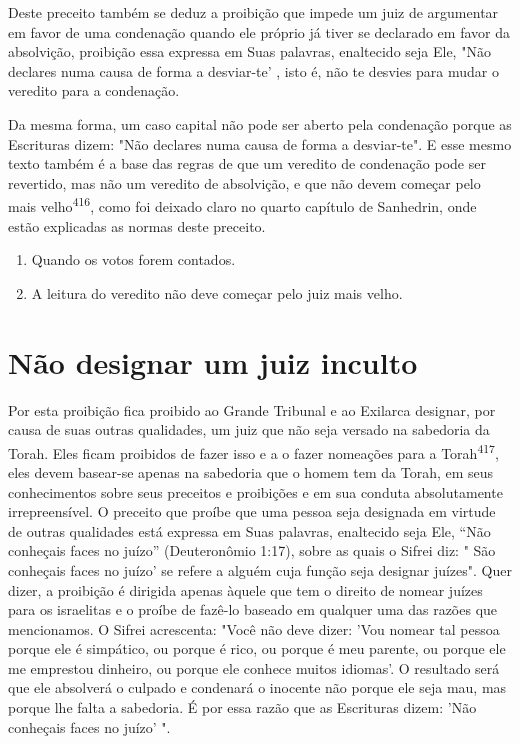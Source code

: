 Deste preceito também se deduz a proibição que impede um juiz de
argumentar em favor de uma condenação quando ele próprio já tiver se
decla­rado em favor da absolvição, proibição essa expressa em Suas
palavras, enalte­cido seja Ele, "Não declares numa causa de forma a
desviar-te' , isto é, não te desvies para mudar o veredito para a
condenação.

Da mesma forma, um caso capital não pode ser aberto pela conde­nação
porque as Escrituras dizem: "Não declares numa causa de forma a
desviar-te". E esse mesmo texto também é a base das regras de que um
veredito de condenação pode ser revertido, mas não um veredito de
absolvição, e que não devem começar pelo mais
velho\textsuperscript{416}, como foi deixado claro no quarto capítu­lo
de Sanhedrin, onde estão explicadas as normas deste preceito.


\begin{enumerate}
\def\labelenumi{\arabic{enumi}.}
\setcounter{enumi}{414}
\item
 
 Quando os votos forem contados.
 
\item
 
 A leitura do veredito não deve começar pelo juiz mais velho.
 
\end{enumerate}


\section{Não designar um juiz inculto}

Por esta proibição fica proibido ao Grande Tribunal e ao Exilarca
designar, por causa de suas outras qualidades, um juiz que não seja
versado na sabedoria da Torah. Eles ficam proibidos de fazer isso e a o
fazer nomeações para a Torah\textsuperscript{417}, eles devem basear-se
apenas na sabedoria que o homem tem da Torah, em seus conhecimentos
sobre seus preceitos e proibições e em sua conduta absolutamente
irrepreensível. O preceito que proíbe que uma pessoa seja designada em
virtude de outras qualidades está expressa em Suas palavras, enaltecido
seja Ele, ``Não conheçais faces no juízo'' (Deuteronômio 1:17), so­bre as
quais o Sifrei diz: " São conheçais faces no juízo' se refere a alguém
cuja função seja designar juízes". Quer dizer, a proibição é dirigida
apenas àquele que tem o direito de nomear juízes para os israelitas e o
proíbe de fazê-lo basea­do em qualquer uma das razões que mencionamos. O
Sifrei acrescenta: "Você não deve dizer: 'Vou nomear tal pessoa porque
ele é simpático, ou porque é rico, ou porque é meu parente, ou porque
ele me emprestou dinheiro, ou por­que ele conhece muitos idiomas'. O
resultado será que ele absolverá o culpado e condenará o inocente não
porque ele seja mau, mas porque lhe falta a sabe­doria. É por essa razão
que as Escrituras dizem: 'Não conheçais faces no juízo' ".

